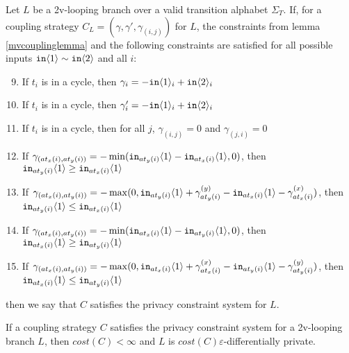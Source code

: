 \begin{defn}\label{mvPrivacyConstraintSystem}
    Let $L$ be a 2v-looping branch over a valid transition alphabet $\Sigma_T$. If, for a coupling strategy $C_L = (\gamma, \gamma', \gamma_{(i, j)})$ for $L$, the constraints from lemma \ref{mvcouplinglemma} and the following constraints are satisfied for all possible inputs $\texttt{in}\langle1 \rangle\sim\texttt{in}\langle2 \rangle$ and all $i$: \begin{enumerate}
        \setcounter{enumi}{8}
        \item If $t_i$ is in a cycle, then $\gamma_i = -\texttt{in}\langle1 \rangle_i+\texttt{in}\langle2 \rangle_i$
        \item If $t_i$ is in a cycle, then $\gamma_i' = -\texttt{in}\langle1 \rangle_i+\texttt{in}\langle2 \rangle_i$
        \item If $t_i$ is in a cycle, then for all $j$, $\gamma_{(i, j)} = 0$ and $\gamma_{(j, i)} = 0$
        \item If $\gamma_{(at_x(i), at_y(i))} = -\min(\texttt{in}_{at_y(i)}\langle1 \rangle-\texttt{in}_{at_x(i)}\langle1 \rangle, 0)$, then $\texttt{in}_{at_y(i)}\langle1 \rangle\geq \texttt{in}_{at_x(i)}\langle1 \rangle$
        \item If $\gamma_{(at_x(i), at_y(i))} = -\max(0, \texttt{in}_{at_y(i)}\langle1 \rangle+ \gamma_{at_y(i)}^{(y)}-\texttt{in}_{at_x(i)}\langle1 \rangle-\gamma_{at_x(i)}^{(x)})$, then $\texttt{in}_{at_y(i)}\langle1 \rangle\leq \texttt{in}_{at_x(i)}\langle1 \rangle$
        \item If $\gamma_{(at_x(i), at_y(i))} = -\min(\texttt{in}_{at_x(i)}\langle1 \rangle-\texttt{in}_{at_y(i)}\langle1 \rangle, 0)$, then $\texttt{in}_{at_x(i)}\langle1 \rangle\geq \texttt{in}_{at_y(i)}\langle1 \rangle$
        \item If $\gamma_{(at_x(i), at_y(i))} = -\max(0, \texttt{in}_{at_x(i)}\langle1 \rangle+ \gamma_{at_x(i)}^{(x)}-\texttt{in}_{at_y(i)}\langle1 \rangle-\gamma_{at_y(i)}^{(y)})$, then $\texttt{in}_{at_x(i)}\langle1 \rangle\leq \texttt{in}_{at_y(i)}\langle1 \rangle$
    \end{enumerate}
    then we say that $C$ satisfies the privacy constraint system for $L$. 
\end{defn}


\begin{lemma}
    If a coupling strategy $C$ satisfies the privacy constraint system for a 2v-looping branch $L$, then $cost(C)<\infty$ and $L$ is $cost(C)\varepsilon$-differentially private. 
\end{lemma}

